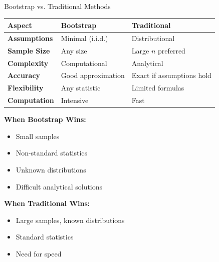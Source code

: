 \documentclass[aspectratio=169]{beamer}
\begin{document}
\begin{frame}{Bootstrap vs. Traditional Methods}
\scriptsize
\begin{center}
\begin{tabular}{|l|p{3cm}|p{3cm}|}
\hline
\textbf{Aspect} & \textbf{Bootstrap} & \textbf{Traditional} \\
\hline
\textbf{Assumptions} & Minimal (i.i.d.) & Distributional \\
\hline
\textbf{Sample Size} & Any size & Large $n$ preferred \\
\hline
\textbf{Complexity} & Computational & Analytical \\
\hline
\textbf{Accuracy} & Good approximation & Exact if assumptions hold \\
\hline
\textbf{Flexibility} & Any statistic & Limited formulas \\
\hline
\textbf{Computation} & Intensive & Fast \\
\hline
\end{tabular}
\end{center}

\vspace{0.1cm}
\textbf{When Bootstrap Wins:}
\begin{itemize}
    \item Small samples
    \item Non-standard statistics
    \item Unknown distributions
    \item Difficult analytical solutions
\end{itemize}

\vspace{0.05cm}
\textbf{When Traditional Wins:}
\begin{itemize}
    \item Large samples, known distributions
    \item Standard statistics
    \item Need for speed
\end{itemize}
\end{frame}
\end{document}
